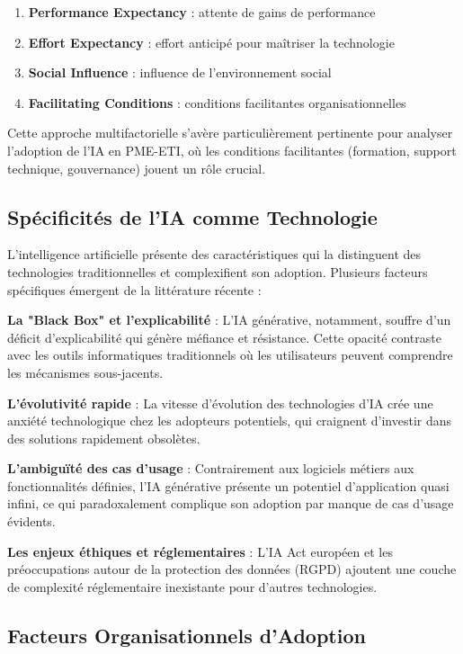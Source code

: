 \documentclass[12pt,a4paper]{report}
\begin{document}
\begin{enumerate}
\item \textbf{Performance Expectancy} : attente de gains de performance
\item \textbf{Effort Expectancy} : effort anticipé pour maîtriser la technologie
\item \textbf{Social Influence} : influence de l'environnement social
\item \textbf{Facilitating Conditions} : conditions facilitantes organisationnelles
\end{enumerate}

Cette approche multifactorielle s'avère particulièrement pertinente pour analyser l'adoption de l'IA en PME-ETI, où les conditions facilitantes (formation, support technique, gouvernance) jouent un rôle crucial.

\subsection{Spécificités de l'IA comme Technologie}

L'intelligence artificielle présente des caractéristiques qui la distinguent des technologies traditionnelles et complexifient son adoption. Plusieurs facteurs spécifiques émergent de la littérature récente :

\textbf{La "Black Box" et l'explicabilité} : L'IA générative, notamment, souffre d'un déficit d'explicabilité qui génère méfiance et résistance. Cette opacité contraste avec les outils informatiques traditionnels où les utilisateurs peuvent comprendre les mécanismes sous-jacents.

\textbf{L'évolutivité rapide} : La vitesse d'évolution des technologies d'IA crée une anxiété technologique chez les adopteurs potentiels, qui craignent d'investir dans des solutions rapidement obsolètes.

\textbf{L'ambiguïté des cas d'usage} : Contrairement aux logiciels métiers aux fonctionnalités définies, l'IA générative présente un potentiel d'application quasi infini, ce qui paradoxalement complique son adoption par manque de cas d'usage évidents.

\textbf{Les enjeux éthiques et réglementaires} : L'IA Act européen et les préoccupations autour de la protection des données (RGPD) ajoutent une couche de complexité réglementaire inexistante pour d'autres technologies.

\subsection{Facteurs Organisationnels d'Adoption}
\end{document}
